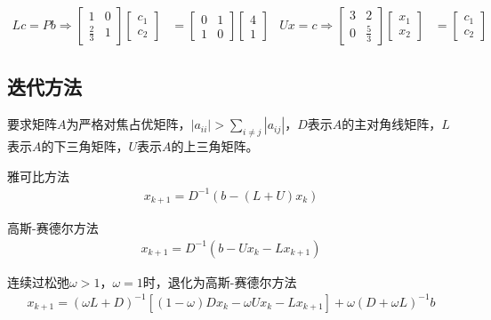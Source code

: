 \documentclass[twocolumn]{article}
\begin{document}
\begin{align*}
    Lc=Pb\Rightarrow
    \begin{bmatrix}
        1           & 0 \\
        \frac{2}{3} & 1
    \end{bmatrix}
    \begin{bmatrix}
        c_1 \\
        c_2
    \end{bmatrix}
     & =
    \begin{bmatrix}
        0 & 1 \\
        1 & 0
    \end{bmatrix}
    \begin{bmatrix}
        4 \\
        1
    \end{bmatrix}
     &
    Ux=c \Rightarrow
    \begin{bmatrix}
        3 & 2           \\
        0 & \frac{5}{3}
    \end{bmatrix}
    \begin{bmatrix}
        x_1 \\
        x_2
    \end{bmatrix}
     & =
    \begin{bmatrix}
        c_1 \\
        c_2
    \end{bmatrix}
\end{align*}

\subsection{迭代方法}
要求矩阵$A$为严格对焦占优矩阵，$|a_{ii}|>\sum_{i\neq j}|a_{ij}|$，$D$表示$A$的主对角线矩阵，$L$表示$A$的下三角矩阵，$U$表示$A$的上三角矩阵。

雅可比方法
\begin{align*}
    x_{k+1}=D^{-1}(b-(L+U)x_k)
\end{align*}

高斯-赛德尔方法
\begin{align*}
    x_{k+1}=D^{-1}(b-Ux_k-Lx_{k+1})
\end{align*}

连续过松弛$\omega>1$，$\omega=1$时，退化为高斯-赛德尔方法
\begin{align*}
    x_{k+1}=(\omega L+D)^{-1}[(1-\omega)Dx_k-\omega Ux_k-Lx_{k+1}]+\omega(D+\omega L)^{-1}b
\end{align*}
\end{document}
